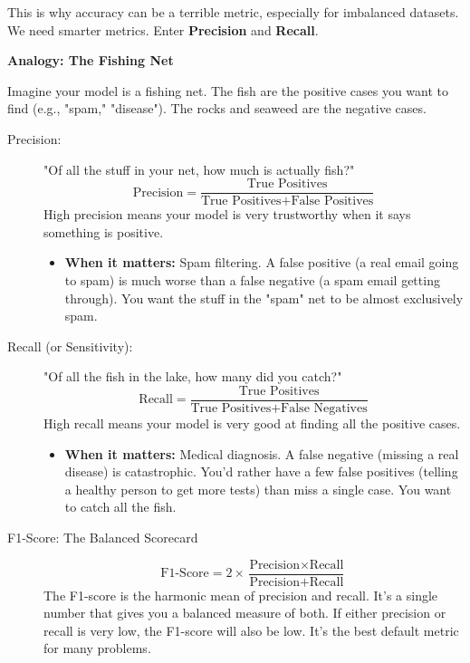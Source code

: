\documentclass[11pt, letterpaper, openany]{book}
\begin{document}
This is why accuracy can be a terrible metric, especially for imbalanced datasets. We need smarter metrics. Enter \textbf{Precision} and \textbf{Recall}.

\textbf{Analogy: The Fishing Net}

Imagine your model is a fishing net. The fish are the positive cases you want to find (e.g., "spam," "disease"). The rocks and seaweed are the negative cases.
\begin{description}
    \item[Precision:] "Of all the stuff in your net, how much is actually fish?"
    \[ \text{Precision} = \frac{\text{True Positives}}{\text{True Positives} + \text{False Positives}} \]
    High precision means your model is very trustworthy when it says something is positive.
    \begin{itemize}
        \item \textbf{When it matters:} Spam filtering. A false positive (a real email going to spam) is much worse than a false negative (a spam email getting through). You want the stuff in the "spam" net to be almost exclusively spam.
    \end{itemize}
    \item[Recall (or Sensitivity):] "Of all the fish in the lake, how many did you catch?"
    \[ \text{Recall} = \frac{\text{True Positives}}{\text{True Positives} + \text{False Negatives}} \]
    High recall means your model is very good at finding all the positive cases.
    \begin{itemize}
        \item \textbf{When it matters:} Medical diagnosis. A false negative (missing a real disease) is catastrophic. You'd rather have a few false positives (telling a healthy person to get more tests) than miss a single case. You want to catch all the fish.
    \end{itemize}
    \item[F1-Score: The Balanced Scorecard]
    \[ \text{F1-Score} = 2 \times \frac{\text{Precision} \times \text{Recall}}{\text{Precision} + \text{Recall}} \]
    The F1-score is the harmonic mean of precision and recall. It's a single number that gives you a balanced measure of both. If either precision or recall is very low, the F1-score will also be low. It's the best default metric for many problems.
\end{description}
\end{document}
